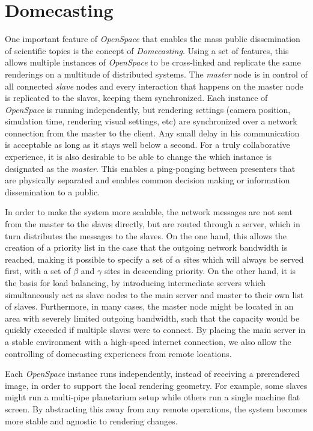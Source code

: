 \documentclass{vgtc}                %
\begin{document}
\section*{Domecasting}
One important feature of \emph{OpenSpace} that enables the mass public dissemination of scientific topics is the concept of \emph{Domecasting}. Using a set of features, this allows multiple instances of \emph{OpenSpace} to be cross-linked and replicate the same renderings on a multitude of distributed systems. The \emph{master} node is in control of all connected \emph{slave} nodes and every interaction that happens on the master node is replicated to the slaves, keeping them synchronized. Each instance of \emph{OpenSpace} is running independently, but rendering settings (camera position, simulation time, rendering visual settings, etc) are synchronized over a network connection from the master to the client. Any small delay in his communication is acceptable as long as it stays well below a second. For a truly collaborative experience, it is also desirable to be able to change the which instance is designated as the \emph{master}. This enables a ping-ponging between presenters that are physically separated and enables common decision making or information dissemination to a public.

In order to make the system more scalable, the network messages are not sent from the master to the slaves directly, but are routed through a server, which in turn distributes the messages to the slaves. On the one hand, this allows the creation of a priority list in the case that the outgoing network bandwidth is reached, making it possible to specify a set of $\alpha$ sites which will always be served first, with a set of $\beta$ and $\gamma$ sites in descending priority. On the other hand, it is the basis for load balancing, by introducing intermediate servers which simultaneously act as slave nodes to the main server and master to their own list of slaves. Furthermore, in many cases, the master node might be located in an area with severely limited outgoing bandwidth, such that the capacity would be quickly exceeded if multiple slaves were to connect. By placing the main server in a stable environment with a high-speed internet connection, we also allow the controlling of domecasting experiences from remote locations.

Each \emph{OpenSpace} instance runs independently, instead of receiving a prerendered image, in order to support the local rendering geometry. For example, some slaves might run a multi-pipe planetarium setup while others run a single machine flat screen. By abstracting this away from any remote operations, the system becomes more stable and agnostic to rendering changes.
\end{document}
